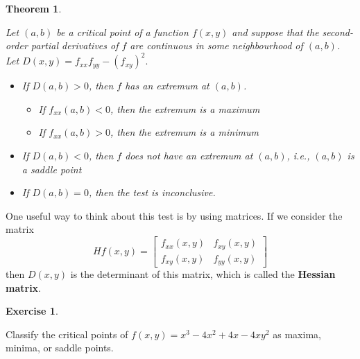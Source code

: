 \documentclass[
]{book}
\providecommand{\tightlist}{%
  \setlength{\itemsep}{0pt}\setlength{\parskip}{0pt}}
\newtheorem{theorem}{Theorem}[chapter]
\theoremstyle{definition}
\theoremstyle{definition}
\theoremstyle{definition}
\newtheorem{exercise}{Exercise}[chapter]
\theoremstyle{definition}
\theoremstyle{remark}
\begin{document}
\begin{theorem}
\protect\hypertarget{thm:unlabeled-div-60}{}\label{thm:unlabeled-div-60}

Let \((a,b)\) be a critical point of a function \(f(x,y)\) and suppose that the second-order partial derivatives of \(f\) are continuous in some neighbourhood of \((a,b)\). Let \(D(x,y)=f_{xx}f_{yy}-(f_{xy})^2.\)

\begin{itemize}
\tightlist
\item
  If \(D(a,b) > 0\), then \(f\) has an extremum at \((a,b)\).

  \begin{itemize}
  \tightlist
  \item
    If \(f_{xx}(a,b)< 0\), then the extremum is a maximum
  \item
    If \(f_{xx}(a,b)> 0\), then the extremum is a minimum
  \end{itemize}
\item
  If \(D(a,b)< 0\), then \(f\) does not have an extremum at \((a,b)\), i.e., \((a,b)\) is a saddle point
\item
  If \(D(a,b)= 0\), then the test is inconclusive.
\end{itemize}

\end{theorem}

One useful way to think about this test is by using matrices. If we consider the matrix \[Hf(x,y)=\begin{bmatrix}f_{xx}(x,y) & f_{xy}(x,y)\\f_{xy}(x,y) & f_{yy}(x,y)\end{bmatrix}\]
then \(D(x,y)\) is the determinant of this matrix, which is called the \textbf{Hessian matrix}.

\begin{exercise}
\protect\hypertarget{exr:unlabeled-div-61}{}\label{exr:unlabeled-div-61}

Classify the critical points of \(f(x,y)= x^3-4x^2+4x-4xy^2\) as maxima, minima, or saddle points.

\end{exercise}
\end{document}
